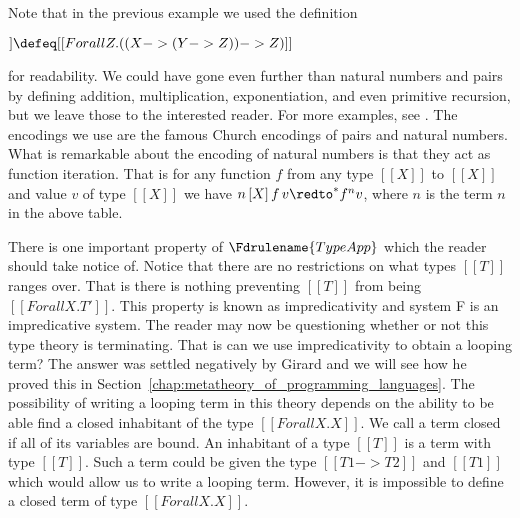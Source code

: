 Note that in the previous example we used the definition 
\begin{center}
  \begin{math}
    [[PAIRTY X Y]] \defeq [[Forall Z.((X -> (Y -> Z)) -> Z)]]
  \end{math}
\end{center}
for readability. We could have gone even further than natural numbers
and pairs by defining
addition, multiplication, exponentiation, and even primitive
recursion, but we leave those to the interested reader.  For more
examples, see \cite{Girard:1989}.  The encodings we use are the famous
Church encodings of pairs and natural numbers.  What is remarkable
about the encoding of natural numbers is that they act as function
iteration.  That is for any function $f$ from any type $[[X]]$ to
$[[X]]$ and value $v$ of type $[[X]]$ we have $n\,[X]\,f\,v \redto^* f^n
v$, where $n$ is the term $n$ in the above table.

There is one important property of $\Fdrulename{TypeApp}$ which the
reader should take notice of.  Notice that there are no restrictions
on what types $[[T]]$ ranges over.  That is there is nothing
preventing $[[T]]$ from being $[[Forall X.T']]$.  This property is
known as impredicativity and system F is an impredicative system.  The
reader may now be questioning whether or not this type theory is
terminating.  That is can we use impredicativity to obtain a looping
term?  The answer was settled negatively by Girard and we will see how
he proved this in Section~\ref{chap:metatheory_of_programming_languages}.
The possibility of writing a looping term in this theory depends on the
ability to be able find a closed inhabitant of the type 
$[[Forall X.X]]$.  We call a term closed if all of its variables are bound.
An inhabitant of a type $[[T]]$ is a term with type $[[T]]$.  Such a
term could be given the type $[[T1 -> T2]]$ and $[[T1]]$ which would
allow us to write a looping term.  However, it is impossible to define
a closed term of type $[[Forall X.X]]$.

